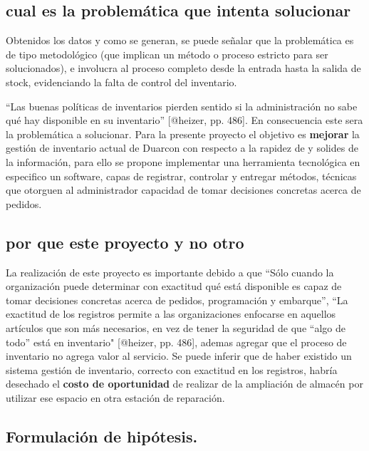 \documentclass[11pt]{article}
\begin{document}
\hypertarget{cual-es-la-problemuxe1tica-que-intenta-solucionar}{%
\subsection{cual es la problemática que intenta
solucionar}\label{cual-es-la-problemuxe1tica-que-intenta-solucionar}}

Obtenidos los datos y como se generan, se puede señalar que la
problemática es de tipo metodológico (que implican un método o proceso
estricto para ser solucionados), e involucra al proceso completo desde
la entrada hasta la salida de stock, evidenciando la falta de control
del inventario.

``Las buenas políticas de inventarios pierden sentido si la
administración no sabe qué hay disponible en su inventario'' {[}@heizer,
pp. 486{]}. En consecuencia este sera la problemática a solucionar. Para
la presente proyecto el objetivo es \textbf{mejorar} la gestión de
inventario actual de Duarcon con respecto a la rapidez de y solides de
la información, para ello se propone implementar una herramienta
tecnológica en especifico un software, capas de registrar, controlar y
entregar métodos, técnicas que otorguen al administrador capacidad de
tomar decisiones concretas acerca de pedidos.

\hypertarget{por-que-este-proyecto-y-no-otro}{%
\subsection{por que este proyecto y no
otro}\label{por-que-este-proyecto-y-no-otro}}

La realización de este proyecto es importante debido a que ``Sólo cuando
la organización puede determinar con exactitud qué está disponible es
capaz de tomar decisiones concretas acerca de pedidos, programación y
embarque'', ``La exactitud de los registros permite a las organizaciones
enfocarse en aquellos artículos que son más necesarios, en vez de tener
la seguridad de que ``algo de todo'' está en inventario" {[}@heizer, pp.
486{]}, ademas agregar que el proceso de inventario no agrega valor al
servicio. Se puede inferir que de haber existido un sistema gestión de
inventario, correcto con exactitud en los registros, habría desechado el
\textbf{costo de oportunidad} de realizar de la ampliación de almacén
por utilizar ese espacio en otra estación de reparación.

\hypertarget{formulaciuxf3n-de-hipuxf3tesis.}{%
\subsection{Formulación de
hipótesis.}\label{formulaciuxf3n-de-hipuxf3tesis.}}
\end{document}
